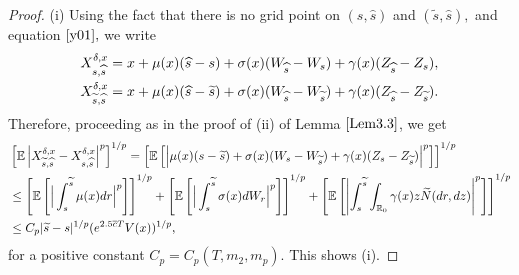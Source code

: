 \documentclass[11pt]{article}
\theoremstyle{theorem}
\theoremstyle{definition}
\newcommand{\bR}{\mathbb{R}}
\newcommand{\1}{{\bf 1}}
\begin{document}
\begin{proof}
(i) Using the fact that there is no grid point on $(s, \widehat{s})$ and $(\widetilde{s}, \widehat{s}),$ and equation $\eqref{y01},$ we write
\begin{align*}
   X^{\delta, x}_{s,\widehat{s}} = x +\mu (x)(\widehat{s}-s)+\sigma(x)(W_{\widehat{s}}-W_s) +  \gamma(x)(Z_{\widehat{s}}-Z_{s}), \notag\\
   X^{\delta, x}_{\widetilde{s},\widehat{s}} = x +\mu (x)(\widehat{s}-\widetilde{s})+\sigma(x)(W_{\widehat{s}}-W_{\widetilde{s}}) +  \gamma(x)(Z_{\widehat{s}}-Z_{\widetilde{s}}).
\end{align*}
Therefore, proceeding as in the proof of (ii) of Lemma $\ref{Lem3.3}$, we get 
\begin{align*}
&\left[\mathbb{E}\left|X^{\delta, x}_{\widetilde{s},\widehat{s}}-X^{\delta, x}_{s,\widehat{s}}\right|^p\right]^{1/p} 
= \left[\mathbb{E}\left[\Big|\mu (x)(s-\widetilde{s})+\sigma(x)(W_s-W_{\widetilde{s}}) +  \gamma(x)(Z_{s}-Z_{\widetilde{s}})\Big|^p\right]\right]^{1/p} \notag \\
& \le \left[\mathbb{E}\left[\Big| \int_s^{\widetilde{s}} \mu (x)dr\Big|^p\right]\right]^{1/p} + \left[\mathbb{E}\left[\Big| \int_s^{\widetilde{s}} \sigma (x)dW_r\Big|^p\right]\right]^{1/p} + \left[\mathbb{E} \left[\left| \int_s^{\widetilde{s}} \int _{\bR_0}\gamma(x) z \widetilde{N}(dr, dz) \right|^p\right]\right]^{1/p}\notag \\
 & \leq C_p |\widetilde{s} -s|^{1/p} (e^{2.5\overline{c}T}V(x))^{1/p},
\end{align*}   
for a positive constant $C_p=C_p(T,m_2, m_p)$. This shows (i).


\end{proof}
\end{document}
